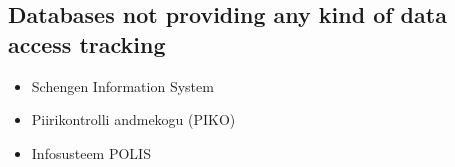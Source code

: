 \subsection{Databases not providing any kind of data access tracking}
\begin{itemize}
    \item{Schengen Information System}
    \item{Piirikontrolli andmekogu (PIKO)}
    \item{Infosusteem POLIS}
\end{itemize}
